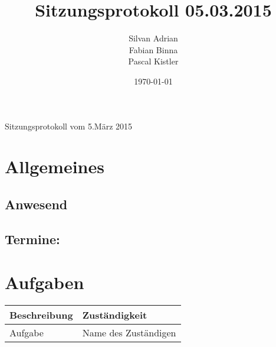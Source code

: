 \documentclass[11pt]{scrartcl}
\title{Sitzungsprotokoll 05.03.2015} %
\author{Silvan Adrian \\ Fabian Binna \\ Pascal Kistler}
\date{\today{}}
\begin{document}
{\huge Sitzungsprotokoll vom 5.März 2015} %

\section{Allgemeines}
\label{sec:Allgemein}

\subsection{Anwesend}
\label{sec:Anwesend}


\subsection{Termine:}
\label{sec:Termine}

\section{Aufgaben}
\label{sec:Aufgaben}
\begin{table}[h]
\begin{tabularx}{\textwidth}{X l }
\textbf{Beschreibung}  & \textbf{Zuständigkeit} \\
\hline
Aufgabe & Name des Zuständigen\\
\hline

\end{tabularx}
\end{table}
\end{document}
